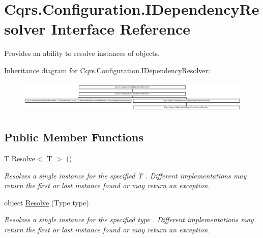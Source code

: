 \hypertarget{interfaceCqrs_1_1Configuration_1_1IDependencyResolver}{}\section{Cqrs.\+Configuration.\+I\+Dependency\+Resolver Interface Reference}
\label{interfaceCqrs_1_1Configuration_1_1IDependencyResolver}


Provides an ability to resolve instances of objects.  


Inheritance diagram for Cqrs.\+Configuration.\+I\+Dependency\+Resolver\+:\begin{figure}[H]
\begin{center}
\leavevmode
\includegraphics[height=1.551247cm]{interfaceCqrs_1_1Configuration_1_1IDependencyResolver}
\end{center}
\end{figure}
\subsection*{Public Member Functions}
\begin{DoxyCompactItemize}
\item 
T \hyperlink{interfaceCqrs_1_1Configuration_1_1IDependencyResolver_a9dc7694a365209a5ef05270a7cfa7b6b_a9dc7694a365209a5ef05270a7cfa7b6b}{Resolve$<$ T $>$} ()
\begin{DoxyCompactList}\small\item\em Resolves a single instance for the specified {\itshape T} . Different implementations may return the first or last instance found or may return an exception. \end{DoxyCompactList}\item 
object \hyperlink{interfaceCqrs_1_1Configuration_1_1IDependencyResolver_aa455096b7b94fc1d64904bc67830ec06_aa455096b7b94fc1d64904bc67830ec06}{Resolve} (Type type)
\begin{DoxyCompactList}\small\item\em Resolves a single instance for the specified {\itshape type} . Different implementations may return the first or last instance found or may return an exception. \end{DoxyCompactList}\end{DoxyCompactItemize}


